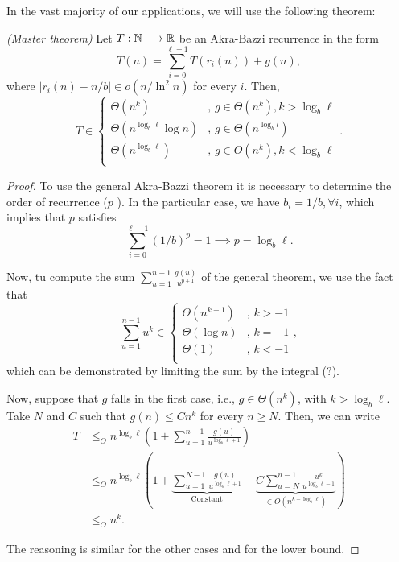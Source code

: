 In the vast majority of our applications, we will use the following theorem:
\begin{theorem}
    \emph{(Master theorem)}
    Let $T : \mathbb{N} \longrightarrow \mathbb{R}$ be an Akra-Bazzi recurrence in the form \[
    T(n) = \sum_{i=0}^{\ell-1} T(r_i(n)) + g(n)
    ,\] where $\left| r_i(n) - n / b \right| \in o(n / \ln^2 n)$ for every $i$.
    Then, \[
    T \in \begin{cases}
	\Theta(n^{k}) &,\, g \in \Theta(n^{k}), k > \log_b \ell \\
	\Theta(n^{\log_b \ell} \log n) &,\, g \in \Theta(n^{\log_b l}) \\
	\Theta(n^{\log_b \ell}) &,\, g \in O(n^{k}), k < \log_b \ell \\
    \end{cases}
    .\] 
\end{theorem}
\begin{proof}
    To use the general Akra-Bazzi theorem it is necessary to determine the order of recurrence ($p$ ).
    In the particular case, we have $b_i = 1 / b, \forall i$, which implies that $p$ satisfies \[
    \sum_{i=0}^{\ell-1} (1 / b)^{p} = 1 \implies p = \log_b \ell
    .\] 

    Now, tu compute the sum $\sum_{u=1}^{n-1} \frac{g(u)}{u^{p+1}}$ of the general theorem, we use the fact that \[
    \sum_{u=1}^{n-1} u^{k} \in \begin{cases}
	\Theta(n^{k+1}) &,\, k > -1 \\
	\Theta(\log n) &,\, k = -1 \\
	\Theta(1) &,\, k < -1 \\
    \end{cases}
    ,\] which can be demonstrated by limiting the sum by the integral (?).

    Now, suppose that $g$ falls in the first case, i.e., $g \in \Theta(n^{k})$, with $k>\log_b \ell$.
    Take $N$ and $C$ such that $g(n) \le Cn^{k}$ for every $n\ge N$.
    Then, we can write
    \begin{align*}
	T&\le_O n^{\log_b \ell}\left( 1 + \sum_{u=1}^{n-1} \frac{g(u)}{u^{\log_b \ell+1}} \right) \\
	 &\le_O n^{\log_b \ell}\left( 1 + \underbrace{\sum_{u=1}^{N-1} \frac{g(u)}{u^{\log_b \ell+1}}}_{\text{Constant}} + \underbrace{C\sum_{u=N}^{n-1} \frac{u^{k}}{u^{\log_b \ell - 1}}}_{\in O(n^{k-\log_b \ell})} \right) \\
	 &\le_O n^{k}
    .\end{align*}

    The reasoning is similar for the other cases and for the lower bound.
\end{proof}

